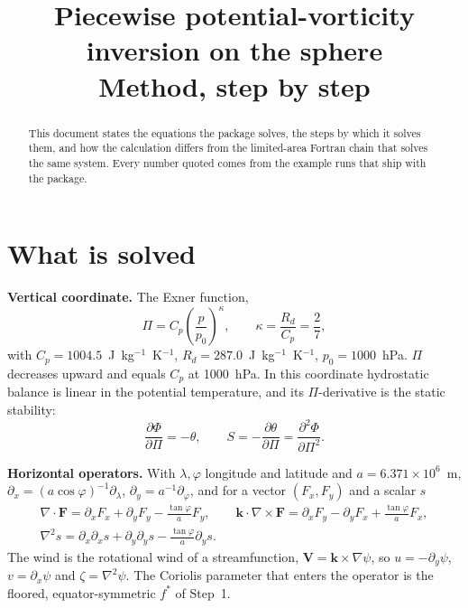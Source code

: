 \documentclass[11pt,a4paper]{article}
\title{Piecewise potential-vorticity inversion on the sphere\\[2mm]
\large Method, step by step}
\author{\code{pv\_inversion\_spherical}}
\date{}
\newcommand{\px}{\partial_x}
\newcommand{\py}{\partial_y}
\newcommand{\dd}[2]{\frac{\partial #1}{\partial #2}}
\newcommand{\ddd}[2]{\frac{\partial^2 #1}{\partial #2^2}}
\newcommand{\lap}{\nabla^2}
\newcommand{\grad}{\nabla}
\newcommand{\bvec}[1]{\mathbf{#1}}
\begin{document}
\maketitle

\begin{abstract}
\noindent
This document states the equations the package solves, the steps by which it
solves them, and how the calculation differs from the limited-area Fortran chain
that solves the same system. Every number quoted comes from the example runs
that ship with the package.
\end{abstract}

\tableofcontents

\section{What is solved}
\label{sec:what}

\textbf{Vertical coordinate.} The Exner function,
\begin{equation}
\Pi = C_p\left(\frac{p}{p_0}\right)^{\kappa},
\qquad
\kappa = \frac{R_d}{C_p} = \frac{2}{7},
\label{eq:exner}
\end{equation}
with $C_p=1004.5$~J~kg$^{-1}$~K$^{-1}$, $R_d=287.0$~J~kg$^{-1}$~K$^{-1}$,
$p_0=1000$~hPa. $\Pi$ decreases upward and equals $C_p$ at 1000~hPa. In this
coordinate hydrostatic balance is linear in the potential temperature, and its
$\Pi$-derivative is the static stability:
\begin{equation}
\dd{\Phi}{\Pi} = -\theta ,
\qquad
S = -\dd{\theta}{\Pi} = \ddd{\Phi}{\Pi} .
\label{eq:hydrostatic}
\end{equation}

\textbf{Horizontal operators.} With $\lambda,\varphi$ longitude and latitude
and $a=6.371\times10^{6}$~m,
$\px=(a\cos\varphi)^{-1}\partial_\lambda$, $\py=a^{-1}\partial_\varphi$, and
for a vector $(F_x,F_y)$ and a scalar $s$
\begin{equation}
\begin{gathered}
\grad\cdot\bvec{F} = \px F_x + \py F_y - \frac{\tan\varphi}{a}F_y ,
\qquad
\bvec{k}\cdot\grad\times\bvec{F} = \px F_y - \py F_x + \frac{\tan\varphi}{a}F_x ,\\
\lap s = \px\px s + \py\py s - \frac{\tan\varphi}{a}\py s .
\end{gathered}
\label{eq:ops}
\end{equation}
The wind is the rotational wind of a streamfunction,
$\bvec{V}=\bvec{k}\times\grad\psi$, so $u=-\py\psi$, $v=\px\psi$ and
$\zeta=\lap\psi$. The Coriolis parameter that enters the operator is the
floored, equator-symmetric $f^{*}$ of Step~1.
\end{document}
